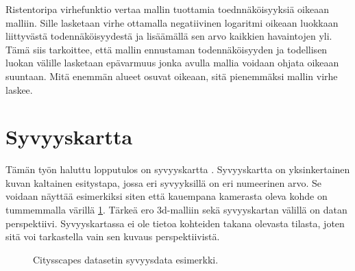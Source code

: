 Ristentoripa virhefunktio vertaa mallin tuottamia toednnäköisyyksiä oikeaan malliin. 
Sille lasketaan virhe ottamalla negatiivinen logaritmi oikeaan luokkaan liittyvästä todennäköisyydestä ja lisäämällä sen arvo kaikkien havaintojen yli.
Tämä siis tarkoittee, että mallin ennustaman todennäköisyyden ja todellisen luokan välille lasketaan epävarmuus jonka avulla mallia voidaan ohjata oikeaan suuntaan.
Mitä enemmän alueet osuvat oikeaan, sitä pienemmäksi mallin virhe laskee.

\section{Syvyyskartta}

Tämän työn haluttu lopputulos on syvyyskartta \cite{IkeuchiKatsushi1987DaDM}.
Syvyyskartta on yksinkertainen kuvan kaltainen esitystapa, jossa eri syvyyksillä on eri numeerinen arvo.
Se voidaan näyttää esimerkiksi siten että kauempana kamerasta oleva kohde on tummemmalla värillä \ref{fig:depth}.
Tärkeä ero 3d-malliin sekä syvyyskartan välillä on datan perspektiivi.
Syvyyskartassa ei ole tietoa kohteiden takana olevasta tilasta, joten sitä voi tarkastella vain sen kuvaus perspektiivistä.


\begin{figure}[h]
\centering
{}
\caption[Tämä on lyhyt kuvateksti.]{Citysscapes datasetin syvyysdata esimerkki.}
\label{fig:depth}
\end{figure}
